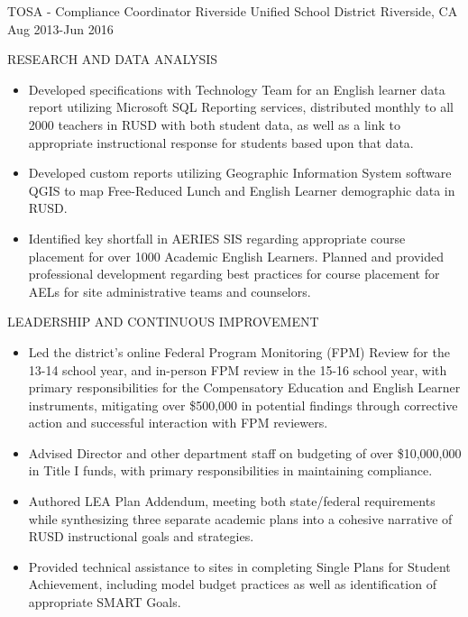 \begin{cventries}
  \cventry
    {TOSA - Compliance Coordinator} %
    {Riverside Unified School District} %
    {Riverside, CA} %
    {Aug 2013-Jun 2016} %
    {
      \begin{cvitems} %
          \item RESEARCH AND DATA ANALYSIS
          \begin{itemize}
            \item {Developed specifications with Technology Team for an English
            learner data report utilizing Microsoft SQL Reporting services,
            distributed monthly to all 2000 teachers in RUSD with both student data,
            as well as a link to appropriate instructional response for students
            based upon that data.}
            \item {Developed custom reports utilizing Geographic Information System
            software QGIS to map Free-Reduced Lunch and English Learner demographic
            data in RUSD.}
            \item {Identified key shortfall in AERIES SIS regarding appropriate
            course placement for over 1000 Academic English Learners. Planned and
            provided professional development regarding best practices for course
            placement for AELs for site administrative teams and counselors.}
          \end{itemize}
          \item LEADERSHIP AND CONTINUOUS IMPROVEMENT
          \begin{itemize}
            \item {Led the district’s online Federal Program Monitoring (FPM) Review
            for the 13-14 school year, and in-person FPM review in the 15-16 school
            year, with primary responsibilities for the Compensatory Education and
            English Learner instruments, mitigating over \$500,000 in potential
            findings through corrective action and successful interaction with FPM
            reviewers.}
            \item {Advised Director and other department staff on budgeting of over
            \$10,000,000 in Title I funds, with primary responsibilities in
            maintaining compliance.}
            \item {Authored LEA Plan Addendum, meeting both state/federal
            requirements while synthesizing three separate academic plans into a
            cohesive narrative of RUSD instructional goals and strategies.}
            \item {Provided technical assistance to sites in completing Single Plans
            for Student Achievement, including model budget practices as well as
            identification of appropriate SMART Goals.}
          \end{itemize}
      \end{cvitems}
    }



\end{cventries}
